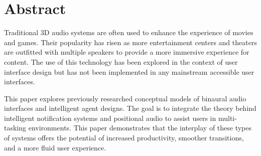 \newpage                                                     \chapter{Abstract}

Traditional 3D audio systems are often used to enhance the experience of movies
and games. Their popularity has risen as more entertainment centers and theaters
are outfitted with multiple speakers to provide a more immersive experience for
content. The use of this technology has been explored in the context of user
interface design but has not been implemented in any mainstream accessible user
interfaces.

This paper explores previously researched conceptual models of binaural audio
interfaces and intelligent agent designs. The goal is to integrate the theory
behind intelligent notification systems and positional audio  to assist users in
multi-tasking environments. This paper demonstrates that the interplay of these
types of systems offers the potential of increased productivity, smoother 
transitions, and a more fluid user experience.
